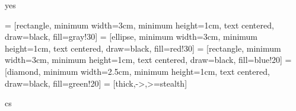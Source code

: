 \def\LangCS{cs}
\def\LangEN{en}
\def\ConfirmExpr{yes}




\ifx\PackagesIncludeTikz\ConfirmExpr
	\usepackage{memoize}
	\usepackage{collargs}
	\usepackage{tikz}
	\usepackage{tikz-cd}
	\usepackage{circuitikz}

	\usetikzlibrary{calc}
	\usetikzlibrary{fadings}
	\usetikzlibrary{shapes.geometric, arrows, positioning}

	 = [rectangle, minimum width=3cm, minimum height=1cm, text centered, draw=black, fill=gray!30]
	 = [ellipse, minimum width=3cm, minimum height=1cm, text centered, draw=black, fill=red!30]
	 = [rectangle, minimum width=3cm, minimum height=1cm, text centered, draw=black, fill=blue!20]
	 = [diamond, minimum width=2.5cm, minimum height=1cm, text centered, draw=black, fill=green!20]
	 = [thick,->,>=stealth]
\fi




\ifx\DocLanguage\LangCS
	\usepackage[czech]{babel}
\else
	\usepackage[english]{babel}
\fi


\usepackage[T1]{fontenc}
\usepackage[utf8]{inputenc}
\usepackage{lmodern,textcomp}

\usepackage[a-2u]{pdfx}         %
\usepackage{graphicx}						%
\usepackage{caption}						%
\usepackage{subcaption} 				%
\usepackage{hyperref} 					%
\usepackage{tabularx}           %
\usepackage{xcolor,colortbl}    %
\usepackage{textpos}            %
\usepackage{longtable}          %
\usepackage{fancyhdr}						%
\usepackage{xurl}								%
\usepackage{enumitem}           %
\usepackage{multicol}           %

